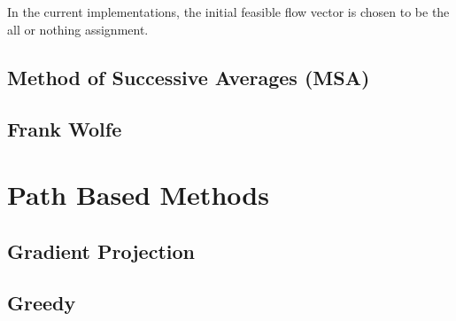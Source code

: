 In the current implementations, the initial feasible flow
vector is chosen to be the all or nothing assignment.



\subsection{Method of Successive Averages (MSA)}


\subsection{Frank Wolfe}


\section{Path Based Methods}
\subsection{Gradient Projection}


\subsection{Greedy}

